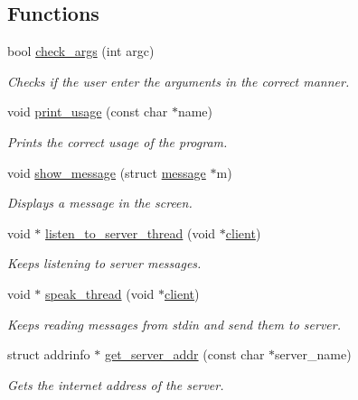 \subsection*{Functions}
\begin{DoxyCompactItemize}
\item 
bool \hyperlink{zip-zop-client_8c_ae42aaff0193542f01451e25d0d0e6725}{check\+\_\+args} (int argc)
\begin{DoxyCompactList}\small\item\em Checks if the user enter the arguments in the correct manner. \end{DoxyCompactList}\item 
void \hyperlink{zip-zop-client_8c_a120fec5c70bad673e9b1c2e91b28fe5f}{print\+\_\+usage} (const char $\ast$name)
\begin{DoxyCompactList}\small\item\em Prints the correct usage of the program. \end{DoxyCompactList}\item 
void \hyperlink{zip-zop-client_8c_aec5550cf115ba01d0da023ba9d1876bb}{show\+\_\+message} (struct \hyperlink{structmessage}{message} $\ast$m)
\begin{DoxyCompactList}\small\item\em Displays a message in the screen. \end{DoxyCompactList}\item 
void $\ast$ \hyperlink{zip-zop-client_8c_aed34485ec5832caf3b952362921111b4}{listen\+\_\+to\+\_\+server\+\_\+thread} (void $\ast$\hyperlink{structclient}{client})
\begin{DoxyCompactList}\small\item\em Keeps listening to server messages. \end{DoxyCompactList}\item 
void $\ast$ \hyperlink{zip-zop-client_8c_a7ca038c133aa6aca1c539e69d4ee675f}{speak\+\_\+thread} (void $\ast$\hyperlink{structclient}{client})
\begin{DoxyCompactList}\small\item\em Keeps reading messages from {\ttfamily stdin} and send them to server. \end{DoxyCompactList}\item 
struct addrinfo $\ast$ \hyperlink{zip-zop-client_8c_a76840de4643d86b9d0a968ec2d1acae3}{get\+\_\+server\+\_\+addr} (const char $\ast$server\+\_\+name)
\begin{DoxyCompactList}\small\item\em Gets the internet address of the server. \end{DoxyCompactList}\item 

\end{DoxyCompactItemize}
